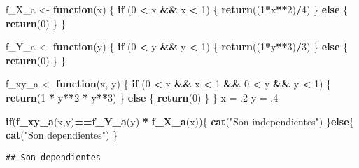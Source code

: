 \documentclass[
]{article}
\newenvironment{Shaded}{\begin{snugshade}}{\end{snugshade}}
\newcommand{\ControlFlowTok}[1]{\textcolor[rgb]{0.13,0.29,0.53}{\textbf{#1}}}
\newcommand{\DecValTok}[1]{\textcolor[rgb]{0.00,0.00,0.81}{#1}}
\newcommand{\FunctionTok}[1]{\textcolor[rgb]{0.13,0.29,0.53}{\textbf{#1}}}
\newcommand{\NormalTok}[1]{#1}
\newcommand{\OtherTok}[1]{\textcolor[rgb]{0.56,0.35,0.01}{#1}}
\newcommand{\SpecialCharTok}[1]{\textcolor[rgb]{0.81,0.36,0.00}{\textbf{#1}}}
\newcommand{\StringTok}[1]{\textcolor[rgb]{0.31,0.60,0.02}{#1}}
\begin{document}
\begin{Shaded}
\begin{Highlighting}[]
\NormalTok{f\_X\_a }\OtherTok{\textless{}{-}} \ControlFlowTok{function}\NormalTok{(x) \{}
  \ControlFlowTok{if}\NormalTok{ (}\DecValTok{0} \SpecialCharTok{\textless{}}\NormalTok{ x }\SpecialCharTok{\&\&}\NormalTok{ x }\SpecialCharTok{\textless{}} \DecValTok{1}\NormalTok{) \{}
    \FunctionTok{return}\NormalTok{((}\DecValTok{1}\SpecialCharTok{*}\NormalTok{x}\SpecialCharTok{**}\DecValTok{2}\NormalTok{)}\SpecialCharTok{/}\DecValTok{4}\NormalTok{)}
\NormalTok{  \} }\ControlFlowTok{else}\NormalTok{ \{}
    \FunctionTok{return}\NormalTok{(}\DecValTok{0}\NormalTok{)}
\NormalTok{  \}}
\NormalTok{\}}

\NormalTok{f\_Y\_a }\OtherTok{\textless{}{-}} \ControlFlowTok{function}\NormalTok{(y) \{}
  \ControlFlowTok{if}\NormalTok{ (}\DecValTok{0} \SpecialCharTok{\textless{}}\NormalTok{ y }\SpecialCharTok{\&\&}\NormalTok{ y }\SpecialCharTok{\textless{}} \DecValTok{1}\NormalTok{) \{}
    \FunctionTok{return}\NormalTok{((}\DecValTok{1}\SpecialCharTok{*}\NormalTok{y}\SpecialCharTok{**}\DecValTok{3}\NormalTok{)}\SpecialCharTok{/}\DecValTok{3}\NormalTok{)}
\NormalTok{  \} }\ControlFlowTok{else}\NormalTok{ \{}
    \FunctionTok{return}\NormalTok{(}\DecValTok{0}\NormalTok{)}
\NormalTok{  \}}
\NormalTok{\}}

\NormalTok{f\_xy\_a }\OtherTok{\textless{}{-}} \ControlFlowTok{function}\NormalTok{(x, y) \{}
  \ControlFlowTok{if}\NormalTok{ (}\DecValTok{0} \SpecialCharTok{\textless{}}\NormalTok{ x }\SpecialCharTok{\&\&}\NormalTok{ x }\SpecialCharTok{\textless{}} \DecValTok{1} \SpecialCharTok{\&\&} \DecValTok{0} \SpecialCharTok{\textless{}}\NormalTok{ y }\SpecialCharTok{\&\&}\NormalTok{ y }\SpecialCharTok{\textless{}} \DecValTok{1}\NormalTok{) \{}
    \FunctionTok{return}\NormalTok{(}\DecValTok{1} \SpecialCharTok{*}\NormalTok{ y}\SpecialCharTok{**}\DecValTok{2} \SpecialCharTok{*}\NormalTok{ y}\SpecialCharTok{**}\DecValTok{3}\NormalTok{)}
\NormalTok{  \} }\ControlFlowTok{else}\NormalTok{ \{}
    \FunctionTok{return}\NormalTok{(}\DecValTok{0}\NormalTok{)}
\NormalTok{  \}}
\NormalTok{\}}
\NormalTok{x }\OtherTok{=}\NormalTok{ .}\DecValTok{2}
\NormalTok{y }\OtherTok{=}\NormalTok{ .}\DecValTok{4}



\ControlFlowTok{if}\NormalTok{(}\FunctionTok{f\_xy\_a}\NormalTok{(x,y)}\SpecialCharTok{==}\FunctionTok{f\_Y\_a}\NormalTok{(y) }\SpecialCharTok{*} \FunctionTok{f\_X\_a}\NormalTok{(x))\{}
  \FunctionTok{cat}\NormalTok{(}\StringTok{"Son independientes"}\NormalTok{)}
\NormalTok{\}}\ControlFlowTok{else}\NormalTok{\{}
  \FunctionTok{cat}\NormalTok{(}\StringTok{"Son dependientes"}\NormalTok{)}
\NormalTok{\}}
\end{Highlighting}
\end{Shaded}

\begin{verbatim}
## Son dependientes
\end{verbatim}
\end{document}
